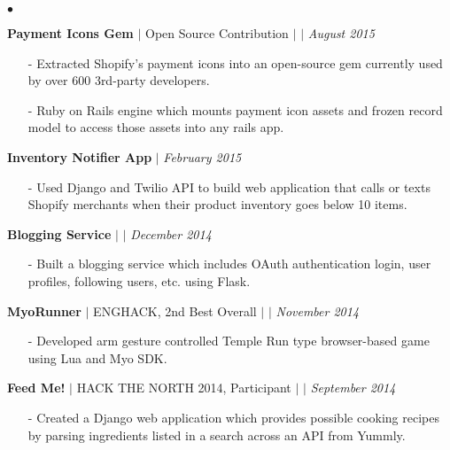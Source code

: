 \documentclass[10pt]{article}
\newenvironment{achievements}{\begin{list}{$\bullet$}{\topsep 0pt \itemsep -1.5pt \leftmargin 5pt}}{\vspace*{4pt}\end{list}}
\begin{document}
\begin{achievements}
\vspace{2pt}
\item \textbf{Payment Icons Gem} {$|$ \scriptsize Open Source Contribution} $|$  \href{https://github.com/activemerchant/payment_icons}{\faGithub} $|$ \href{http://rubygems.org/gems/payment_icons}{\faDiamond} \hfill \textit {August 2015}
\begin{itemize}
\item[-]Extracted Shopify's payment icons into an open-source gem currently used by over 600 3rd-party developers.
\vspace{2pt}
\item[-]Ruby on Rails engine which mounts payment icon assets and frozen record model to access those assets into any rails app.
\end{itemize}
\vspace{2pt}
\item \textbf{Inventory Notifier App} $|$  \href{https://github.com/nakulpathak3/twilio-shopify-notifier}{\faGithub} \hfill \textit {February 2015}
\begin{itemize}
\item[-]Used Django and Twilio API to build web application that calls or texts Shopify merchants when their product inventory goes below 10 items.
\end{itemize}
\vspace{2pt}
\item \textbf{Blogging Service} $|$  \href{https://github.com/nakulpathak3/complete-microblog-flask}{\faGithub}  $|$ \href{http://nakul-microblog.herokuapp.com/}{\faExternalLink}  \hfill \textit {December 2014}
\begin{itemize}
\item[-]Built a blogging service which includes OAuth authentication login, user profiles, following users, etc. using Flask.
\end{itemize}
\vspace{2pt}
\item\textbf{MyoRunner} {$|$ \scriptsize ENGHACK, 2nd Best Overall }  $|$  \href{https://github.com/nakulpathak3/myorunner}{\faGithub} $|$ \href{http://jhudson.ca/myorunaway}{\faExternalLink}\hfill \textit {November 2014}
\begin{itemize}
\item[-]Developed arm gesture controlled Temple Run type browser-based game using Lua and Myo SDK.
\end{itemize}
\vspace{2pt}
\item \textbf{Feed Me!} {$|$ \scriptsize HACK THE NORTH 2014, Participant}   $|$  \href{https://github.com/nakulpathak3/FeedMe}{\faGithub}   $|$  \href{http://nakul-feedme.herokuapp.com/}{\faExternalLink}\hfill \textit {September 2014}
\begin{itemize}
\item[-]Created a Django web application which provides possible cooking recipes by parsing ingredients listed in a search across an API from Yummly.
\end{itemize}
\end{achievements}
\end{document}
